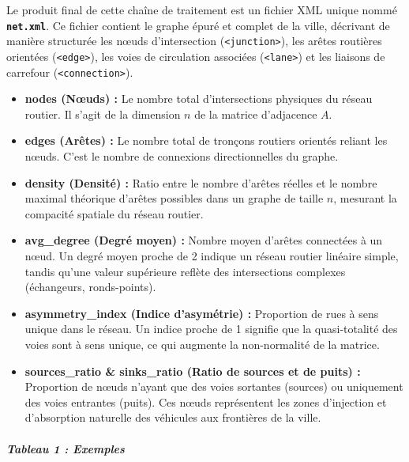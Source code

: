 \documentclass[10pt, a4paper]{article}
\begin{document}
Le produit final de cette chaîne de traitement est un fichier XML unique
nommé \textbf{\texttt{net.xml}}. Ce fichier contient le graphe épuré et
complet de la ville, décrivant de manière structurée les nœuds
d'intersection (\texttt{\textless{}junction\textgreater{}}), les arêtes
routières orientées (\texttt{\textless{}edge\textgreater{}}), les voies
de circulation associées (\texttt{\textless{}lane\textgreater{}}) et les
liaisons de carrefour (\texttt{\textless{}connection\textgreater{}}).

\begin{itemize}
\item
  \textbf{nodes (Nœuds) :} Le nombre total d'intersections physiques du
  réseau routier. Il s'agit de la dimension \(n\) de la matrice
  d'adjacence \(A\).
\item
  \textbf{edges (Arêtes) :} Le nombre total de tronçons routiers
  orientés reliant les nœuds. C'est le nombre de connexions
  directionnelles du graphe.
\item
  \textbf{density (Densité) :} Ratio entre le nombre d'arêtes réelles et
  le nombre maximal théorique d'arêtes possibles dans un graphe de
  taille \(n\), mesurant la compacité spatiale du réseau routier.
\item
  \textbf{avg\_degree (Degré moyen) :} Nombre moyen d'arêtes connectées
  à un nœud. Un degré moyen proche de 2 indique un réseau routier
  linéaire simple, tandis qu'une valeur supérieure reflète des
  intersections complexes (échangeurs, ronds-points).
\item
  \textbf{asymmetry\_index (Indice d'asymétrie) :} Proportion de rues à
  sens unique dans le réseau. Un indice proche de 1 signifie que la
  quasi-totalité des voies sont à sens unique, ce qui augmente la
  non-normalité de la matrice.
\item
  \textbf{sources\_ratio \& sinks\_ratio (Ratio de sources et de puits)
  :} Proportion de nœuds n'ayant que des voies sortantes (sources) ou
  uniquement des voies entrantes (puits). Ces nœuds représentent les
  zones d'injection et d'absorption naturelle des véhicules aux
  frontières de la ville.
\end{itemize}

\subparagraph{Tableau 1 : Exemples}\label{tableau-1-exemples}
\end{document}
